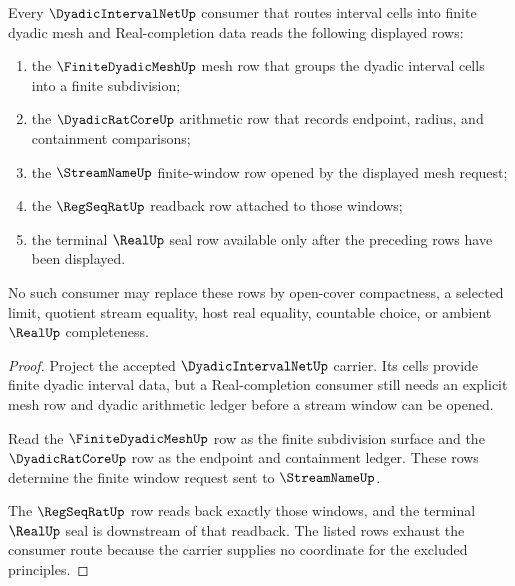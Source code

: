 \begin{theorem}
\label{thm:dyadic-interval-net-finite-mesh-real-completion-route}
Every $\DyadicIntervalNetUp$ consumer that routes interval cells into finite dyadic mesh and Real-completion data reads the following displayed rows:
\begin{enumerate}
\item the $\FiniteDyadicMeshUp$ mesh row that groups the dyadic interval cells into a finite subdivision;
\item the $\DyadicRatCoreUp$ arithmetic row that records endpoint, radius, and containment comparisons;
\item the $\StreamNameUp$ finite-window row opened by the displayed mesh request;
\item the $\RegSeqRatUp$ readback row attached to those windows;
\item the terminal $\RealUp$ seal row available only after the preceding rows have been displayed.
\end{enumerate}
No such consumer may replace these rows by open-cover compactness, a selected limit, quotient stream equality, host real equality, countable choice, or ambient $\RealUp$ completeness.
\end{theorem}
\begin{proof}
Project the accepted $\DyadicIntervalNetUp$ carrier. Its cells provide finite dyadic interval data, but a Real-completion consumer still needs an explicit mesh row and dyadic arithmetic ledger before a stream window can be opened.

Read the $\FiniteDyadicMeshUp$ row as the finite subdivision surface and the $\DyadicRatCoreUp$ row as the endpoint and containment ledger. These rows determine the finite window request sent to $\StreamNameUp$.

The $\RegSeqRatUp$ row reads back exactly those windows, and the terminal $\RealUp$ seal is downstream of that readback. The listed rows exhaust the consumer route because the carrier supplies no coordinate for the excluded principles.
\end{proof}
